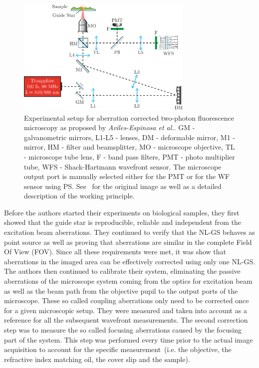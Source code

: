 \begin{figure}
	\centering
		\includegraphics[width=0.75\textwidth]{images/TPFM_guide-star}
	\caption{Experimental setup for aberration corrected two-photon fluorescence microscopy as proposed by \emph{Aviles-Espinosa et al.}. GM - galvanometric mirrors, L1-L5 - lenses, DM - deformable mirror, M1 - mirror, HM - filter and beamsplitter, MO - microscope objective, TL - microscope tube lens, F - band pass filters, PMT - photo multiplier tube, WFS - Shack-Hartmann wavefront sensor. The microscope output port is manually selected either for the PMT or for the WF sensor using PS. See~\cite{scan_TPFM_guide_start} for the original image as well as a detailed description of the working principle.}
	\label{fig:TPFM_guide-star}
\end{figure}

Before the authors started their experiments on biological samples, they first showed that the guide star is reproducible, reliable and independent from the excitation beam aberrations. They continued to verify that the NL-GS behaves as point source as well as proving that aberrations are similar in the complete Field Of View (FOV). Since all these requirements were met, it was show that aberrations in the imaged area can be effectively corrected using only one NL-GS. The authors then continued to calibrate their system, eliminating the passive aberrations of the microscope system coming from the optics for excitation beam as well as the beam path from the objective pupil to the output ports of the microscope. These so called coupling aberrations only need to be corrected once for a given microscopic setup. They were measured and taken into account as a reference for all the subsequent wavefront measurements. The second correction step was to measure the so called focusing aberrations caused by the focusing part of the system. This step was performed every time prior to the actual image acquisition to account for the specific measurement~(i.e. the objective, the refractive index matching oil, the cover slip and the sample).\newline

